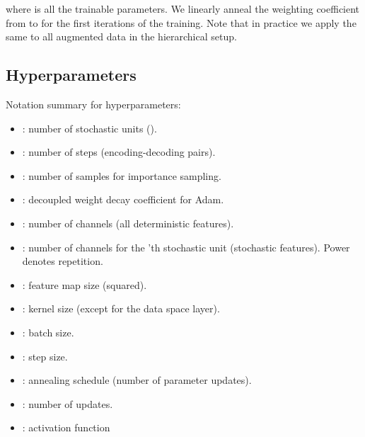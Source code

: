 \documentclass{article}
\begin{document}
where  is all the trainable parameters.
We linearly anneal the weighting coefficient  from  to  for the first  iterations of the training.
Note that in practice we apply the same  to all augmented data in the hierarchical setup. 




\newpage
\subsection{Hyperparameters}
\label{app:hparam}
{Notation summary for hyperparameters:}
\vspace{-3mm}
\begin{itemize}\setlength\itemsep{0.0em}
\item : number of stochastic units ().
\item : number of steps (encoding-decoding pairs).
\item : number of samples for importance sampling.
\item : decoupled weight decay coefficient for Adam.
\item : number of channels (all deterministic features). 
\item : number of channels for the 'th stochastic unit (stochastic features). 
Power denotes repetition.   
\item : feature map size (squared).  
\item : kernel size (except for the data space layer). 
\item : batch size. 
\item : step size.
\item : annealing schedule (number of parameter updates).
\item : number of updates.
\item : activation function
\end{itemize}
\end{document}
